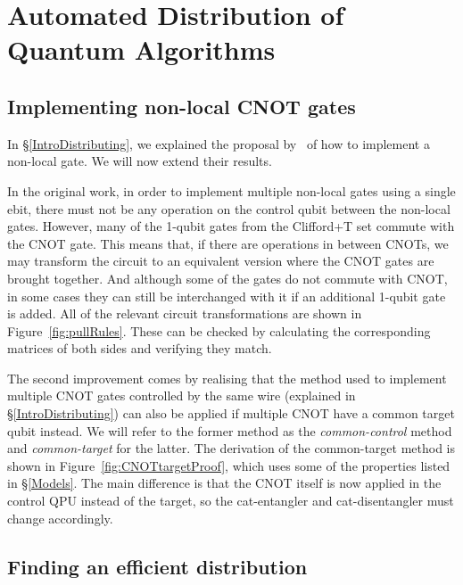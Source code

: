 \chapter{Automated Distribution of Quantum Algorithms}
\label{chap:Project}

\section{Implementing non-local CNOT gates}
\label{NonLocalGates}

In \S\ref{IntroDistributing}, we explained the proposal by~\citet{NonLocalCNOT} of how to implement a non-local gate. We will now extend their results.

In the original work, in order to implement multiple non-local gates using a single ebit, there must not be any operation on the control qubit between the non-local gates. However, many of the 1-qubit gates from the Clifford+T set commute with the CNOT gate. This means that, if there are operations in between CNOTs, we may transform the circuit to an equivalent version where the CNOT gates are brought together. And although some of the gates do not commute with CNOT, in some cases they can still be interchanged with it if an additional 1-qubit gate is added. All of the relevant circuit transformations are shown in Figure~\ref{fig:pullRules}. These can be checked by calculating the corresponding matrices of both sides and verifying they match.



The second improvement comes by realising that the method used to implement multiple CNOT gates controlled by the same wire (explained in \S\ref{IntroDistributing}) can also be applied if multiple CNOT have a common target qubit instead. We will refer to the former method as the \textit{common-control} method and \textit{common-target} for the latter. The derivation of the common-target method is shown in Figure~\ref{fig:CNOTtargetProof}, which uses some of the properties listed in \S\ref{Models}. The main difference is that the CNOT itself is now applied in the control QPU instead of the target, so the cat-entangler and cat-disentangler must change accordingly.



\section{Finding an efficient distribution}
\label{EfficientDistrib}

